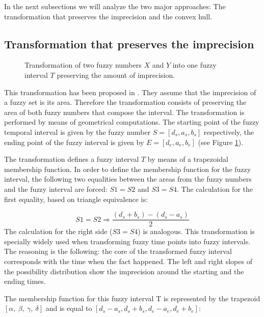 \documentclass[twoside,twocolumn,a4paper]{article}
\begin{document}
In the next subsections we will analyze the two major approaches: The transformation that preserves the imprecision and the convex hull. 




\subsection{\label{subsubsec:transf-pres-imp}Transformation that preserves the imprecision}
\begin{figure}[h!]
  \centering
  
  \caption{Transformation of two fuzzy numbers $X$ and $Y$ into one fuzzy interval $T$ preserving the amount of imprecision.}
  \label{fig:transf-pres-imp}
\end{figure}
This transformation has been proposed in \cite{Garrido2009}. They assume that the imprecision of a fuzzy set is its area. Therefore the transformation consists of preserving the area of both fuzzy numbers that compose the interval. The transformation is performed by means of geometrical computations. The starting point of the fuzzy temporal interval is given by the fuzzy number $S = [d_s,a_s,b_s]$ respectively, the ending point of the fuzzy interval is given by $E = [d_e,a_e,b_e]$ (see Figure \ref{fig:transf-pres-imp}).

The transformation defines a fuzzy interval $T$ by means of a trapezoidal membership function. In order to define the membership function for the fuzzy interval, the following two equalities between the areas from the fuzzy numbers and the fuzzy interval are forced: $S1=S2$ and $S3=S4$. The calculation for the first equality, based on triangle equivalence is:

\begin{equation}
\label{eq:preserving-imprecision}
S1=S2 \Rightarrow \frac{\left(d_s+b_s\right)-\left(d_s-a_s\right)}{2}
\end{equation}        			
The calculation for the right side ($S3=S4$) is analogous.
This transformation is specially widely used when transforming fuzzy time points into fuzzy intervals. The reasoning is the following: the core of the transformed fuzzy interval corresponds with the time when the fact happened. The left and right slopes of the possibility distribution show the imprecision around the starting and the ending times. 

The membership function for this fuzzy interval T is represented by the trapezoid $\left[\alpha,\ \beta,\ \gamma,\ \delta\right]$ and is equal to $\left[ d_s - a_s, d_s + b_s,d_e - a_e,d_e + b_e\right]$:
\end{document}
